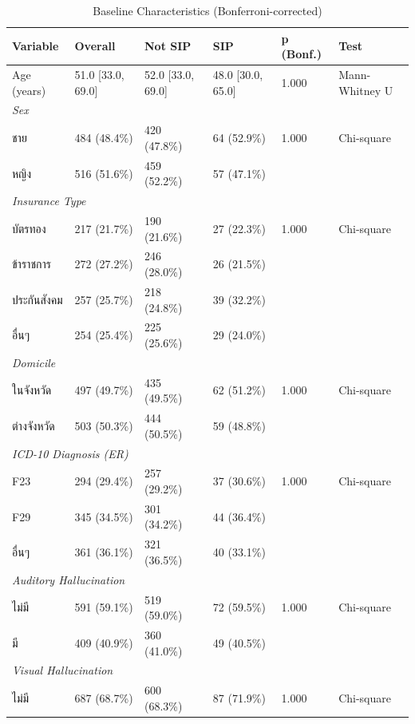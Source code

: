 \begin{table}[htbp]
\centering
\caption{Baseline Characteristics (Bonferroni-corrected)}
\label{tab:tableone_bonf}
\begin{tabular}{llllll}
\toprule
\textbf{Variable} & \textbf{Overall} & \textbf{Not SIP} & \textbf{SIP} & \textbf{p (Bonf.)} & \textbf{Test} \\
\midrule
Age (years) & 51.0 [33.0, 69.0] & 52.0 [33.0, 69.0] & 48.0 [30.0, 65.0] & 1.000 & Mann-Whitney U \\
\multicolumn{6}{l}{\textit{Sex}} \\
\quad ชาย & 484 (48.4\%) & 420 (47.8\%) & 64 (52.9\%) & 1.000 & Chi-square \\
\quad หญิง & 516 (51.6\%) & 459 (52.2\%) & 57 (47.1\%) &  &  \\
\multicolumn{6}{l}{\textit{Insurance Type}} \\
\quad บัตรทอง & 217 (21.7\%) & 190 (21.6\%) & 27 (22.3\%) & 1.000 & Chi-square \\
\quad ข้าราชการ & 272 (27.2\%) & 246 (28.0\%) & 26 (21.5\%) &  &  \\
\quad ประกันสังคม & 257 (25.7\%) & 218 (24.8\%) & 39 (32.2\%) &  &  \\
\quad อื่นๆ & 254 (25.4\%) & 225 (25.6\%) & 29 (24.0\%) &  &  \\
\multicolumn{6}{l}{\textit{Domicile}} \\
\quad ในจังหวัด & 497 (49.7\%) & 435 (49.5\%) & 62 (51.2\%) & 1.000 & Chi-square \\
\quad ต่างจังหวัด & 503 (50.3\%) & 444 (50.5\%) & 59 (48.8\%) &  &  \\
\multicolumn{6}{l}{\textit{ICD-10 Diagnosis (ER)}} \\
\quad F23 & 294 (29.4\%) & 257 (29.2\%) & 37 (30.6\%) & 1.000 & Chi-square \\
\quad F29 & 345 (34.5\%) & 301 (34.2\%) & 44 (36.4\%) &  &  \\
\quad อื่นๆ & 361 (36.1\%) & 321 (36.5\%) & 40 (33.1\%) &  &  \\
\multicolumn{6}{l}{\textit{Auditory Hallucination}} \\
\quad ไม่มี & 591 (59.1\%) & 519 (59.0\%) & 72 (59.5\%) & 1.000 & Chi-square \\
\quad มี & 409 (40.9\%) & 360 (41.0\%) & 49 (40.5\%) &  &  \\
\multicolumn{6}{l}{\textit{Visual Hallucination}} \\
\quad ไม่มี & 687 (68.7\%) & 600 (68.3\%) & 87 (71.9\%) & 1.000 & Chi-square \\

\end{tabular}
\end{table}
